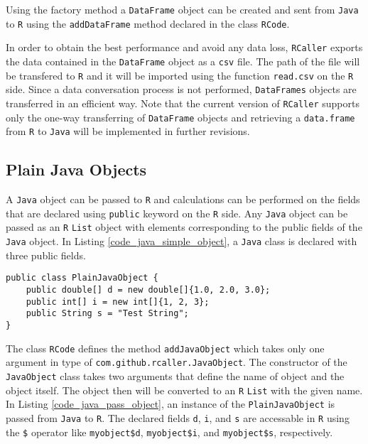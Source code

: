 \documentclass[10pt,a4paper, final, oneside]{article}
\begin{document}
Using the factory method a \texttt{DataFrame} object can be created and sent from \texttt{Java} to \texttt{R} using the \texttt{addDataFrame} method declared in the class \texttt{RCode}. 

In order to obtain the best performance and avoid any data loss, \texttt{RCaller} exports the data contained in the \texttt{DataFrame} object as a \texttt{csv} file. The path of the file will be transfered to \texttt{R} and it will be imported using the function \texttt{read.csv} on the \texttt{R} side. 
Since a data conversation process is not performed, \texttt{DataFrames} objects are transferred in an efficient way. 
Note that the current version of \texttt{RCaller} supports only the one-way transferring of \texttt{DataFrame} objects and retrieving a \texttt{data.frame} from \texttt{R} to \texttt{Java} will be implemented in further revisions. 


\subsection{Plain Java Objects}
\label{sec:passing_pojos}
A \texttt{Java} object can be passed to \texttt{R} and calculations can be performed on the fields that are declared using \texttt{public} keyword on the \texttt{R} side. Any \texttt{Java} object can be passed as an \texttt{R} \texttt{List} object with elements corresponding to the public fields of the \texttt{Java} object. In Listing \ref{code_java_simple_object}, a \texttt{Java} class is declared with three public fields. 

\begin{minipage}{\linewidth}
\begin{lstlisting}[caption=A Plain Java Object Class,label=code_java_simple_object]
public class PlainJavaObject {
    public double[] d = new double[]{1.0, 2.0, 3.0};
    public int[] i = new int[]{1, 2, 3};
    public String s = "Test String";
}
\end{lstlisting}
\end{minipage}

The class \texttt{RCode} defines the method \texttt{addJavaObject} which takes only one argument in type of \texttt{com.github.rcaller.JavaObject}. The constructor of the \texttt{JavaObject} class takes two arguments that define the name of object and the object itself. The object then will be converted to an \texttt{R} \texttt{List} with the given name. In Listing \ref{code_java_pass_object}, an instance of the \texttt{PlainJavaObject} is passed from \texttt{Java} to \texttt{R}. The declared fields \texttt{d}, \texttt{i}, and \texttt{s} are accessable in \texttt{R} using the \texttt{\$} operator like \texttt{myobject\$d}, \texttt{myobject\$i}, and \texttt{myobject\$s}, respectively.
\end{document}
